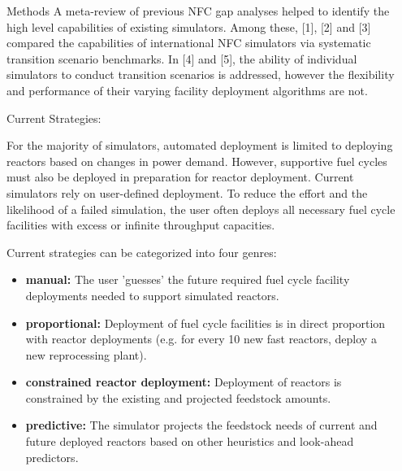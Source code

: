 \documentclass[final]{beamer}
\newlength{\onecolwid}
\newlength{\twocolwid}
\begin{document}
\begin{frame}[t]
\begin{columns}[t]
\begin{column}{\twocolwid}
\begin{columns}[t,totalwidth=\twocolwid]
\begin{column}{\onecolwid}
\begin{block}{Methods}
A meta-review of previous NFC gap analyses helped to identify the high level capabilities of existing simulators. Among these, [1], [2] and [3] compared the capabilities of international NFC simulators via systematic transition scenario benchmarks. In [4] and [5], the ability of individual simulators to conduct transition scenarios is addressed, however the flexibility and performance of their varying facility deployment algorithms are not.

Current Strategies:
	
	For the majority of simulators, automated deployment is limited to deploying reactors based
	on changes in power demand. However, supportive fuel cycles must also be deployed in preparation for
	reactor deployment. Current simulators rely on user-defined deployment. To reduce the effort and
	the likelihood of a failed simulation, the user often deploys all necessary fuel cycle facilities
	with excess or infinite throughput capacities.
	
	Current strategies can be categorized into four genres:
	\begin{itemize}
		\item \textbf{manual:} The user 'guesses' the future required fuel cycle facility deployments needed to support simulated reactors.
		\item \textbf{proportional:} Deployment of fuel cycle facilities is in direct proportion with reactor deployments (e.g. for every 10 new fast reactors, deploy a new reprocessing plant).
		\item \textbf{constrained reactor deployment:} Deployment of reactors is constrained by the existing and projected feedstock amounts.
		\item \textbf{predictive:} The simulator projects the feedstock needs of current and future deployed reactors based on other heuristics and look-ahead predictors.
	\end{itemize}

		
\end{block}


\end{column} %

\begin{column}{\onecolwid}\vspace{-.6in} %


\end{column}
\end{columns}
\end{column}
\end{columns}
\end{frame}
\end{document}
